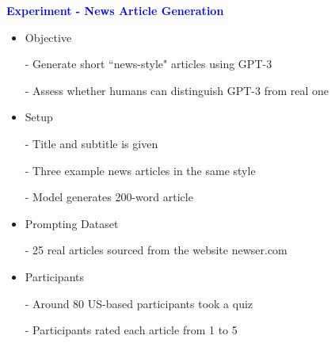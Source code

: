 \documentclass[professionalfont]{beamer}
\begin{document}
\begin{frame}

\begin{center}
    { \textbf{\textcolor{blue}{ {\fontsize{12}{14}\selectfont Experiment - News Article Generation} }} }
\end{center}

{\fontsize{10}{14}\selectfont 
\begin{itemize}
    \item Objective

    - Generate short ``news-style" articles using GPT-3

    - Assess whether humans can distinguish GPT-3 from real one

    \item Setup

    - Title and subtitle is given

    - Three example news articles in the same style

    - Model generates 200-word article

    \item Prompting Dataset

    - 25 real articles sourced from the website newser.com

    \item Participants

    - Around 80 US-based participants took a quiz

    - Participants rated each article from 1 to 5

\end{itemize}
}

\end{frame}
\end{document}
